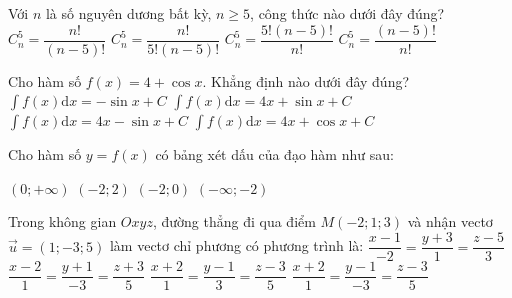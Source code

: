 \begin{ex}%
Với $n$ là số nguyên dương bất kỳ, $n \geq 5$, công thức nào dưới đây đúng?
\choice
{$C_n^5=\dfrac{n !}{(n-5) !}$}
{\True $C_n^5=\dfrac{n !}{5!(n-5) !}$}
{$C_n^5=\dfrac{5!(n-5) !}{n !}$}
{$C_n^5=\dfrac{(n-5) !}{n !}$}

\end{ex}
\begin{ex}%
Cho hàm số $f(x)=4+\cos x$. Khẳng định nào dưới đây đúng?
\choice
{$\displaystyle\int f(x) \mathrm{d} x=-\sin x+C$}
{\True $\displaystyle\int f(x) \mathrm{d} x=4 x+\sin x+C$}
{$\displaystyle\int f(x) \mathrm{d} x=4 x-\sin x+C$}
{$\displaystyle\int f(x) \mathrm{d} x=4 x+\cos x+C$}

\end{ex}
\begin{ex}%
{\vspace{-0.5cm}

}

\end{ex}
\begin{ex}%
Cho hàm số $y=f(x)$ có bảng xét dấu của đạo hàm như sau:
{
}
\choice
{$(0;+\infty)$}
{$(-2; 2)$}
{\True $(-2; 0)$}
{$(-\infty;-2)$}
\end{ex}
\begin{ex}%
Trong không gian $O x y z$, đường thẳng đi qua điểm $M(-2; 1; 3)$ và nhận vectơ $\vec{u}=(1;-3; 5)$ làm vectơ chỉ phương có phương trình là:
\choice
{$\dfrac{x-1}{-2}=\dfrac{y+3}{1}=\dfrac{z-5}{3}$}
{$\dfrac{x-2}{1}=\dfrac{y+1}{-3}=\dfrac{z+3}{5}$}
{$\dfrac{x+2}{1}=\dfrac{y-1}{3}=\dfrac{z-3}{5}$}
{\True $\dfrac{x+2}{1}=\dfrac{y-1}{-3}=\dfrac{z-3}{5}$}

\end{ex}
